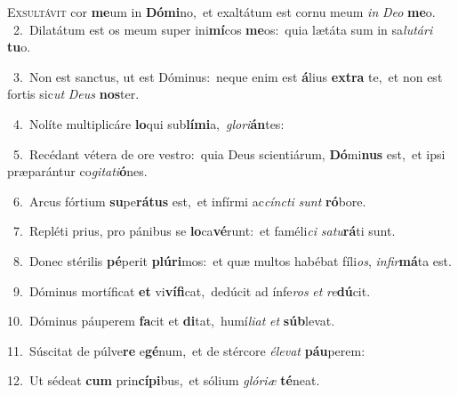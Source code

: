 \lettrine{\initial\textcolor{\initialcolor}{E}}{xsultávit} cor \textbf{me}\-um in \textbf{Dó}\-\textbf{mi}no,~\star et exaltátum est cornu meum \textit{in} \textit{De}\-\textit{o} \textbf{me}\-o.\\
{\numbfont\textcolor{\numbcolor}{~2.}}~Dilatátum est os meum super ini\-\textbf{mí}\-cos \textbf{me}\-os:~\star quia lætáta sum in sa\-\textit{lu}\-\textit{tá}\textit{ri} \textbf{tu}\-o.\par
{\numbfont\textcolor{\numbcolor}{~3.}}~Non est sanctus, ut est Dóminus:~\dagger neque enim est \textbf{á}\-lius \textbf{ex}\-\textbf{tra} te,~\star et non est fortis sic\textit{ut} \textit{De}\-\textit{us} \textbf{nos}\-ter.\par
{\numbfont\textcolor{\numbcolor}{~4.}}~Nolíte multiplicáre \textbf{lo}\-qui sub\-\textbf{lí}\-\textbf{mi}a,~\star \textit{glo}\-\textit{ri}\textbf{án}tes:\par
{\numbfont\textcolor{\numbcolor}{~5.}}~Recédant vétera de ore vestro:~\dagger quia Deus scientiárum, \textbf{Dó}\-mi\textbf{nus} est,~\star et ipsi præparántur co\-\textit{gi}\-\textit{ta}\textit{ti}\textbf{ó}nes.\par
{\numbfont\textcolor{\numbcolor}{~6.}}~Arcus fórtium \textbf{su}\-pe\-\textbf{rá}\-\textbf{tus} est,~\star et infírmi ac\-\textit{cínc}\-\textit{ti} \textit{sunt} \textbf{ró}\-bore.\par
{\numbfont\textcolor{\numbcolor}{~7.}}~Repléti prius, pro pánibus se \textbf{lo}\-ca\-\textbf{vé}\-runt:~\star et faméli\textit{ci} \textit{sa}\-\textit{tu}\textbf{rá}ti sunt.\par
{\numbfont\textcolor{\numbcolor}{~8.}}~Donec stérilis \textbf{pé}\-perit \textbf{plú}\-\textbf{ri}mos:~\star et quæ multos habébat fíli\-\textit{os}\-, \textit{in}\-\textit{fir}\textbf{má}ta est.\par
{\numbfont\textcolor{\numbcolor}{~9.}}~Dóminus mortíficat \textbf{et} vi\-\textbf{ví}\-\textbf{fi}cat,~\star dedúcit ad ínfe\textit{ros} \textit{et} \textit{re}\-\textbf{dú}cit.\par
{\numbfont\textcolor{\numbcolor}{10.}}~Dóminus páuperem \textbf{fa}\-cit et \textbf{di}\-tat,~\star humí\-\textit{li}\-\textit{at} \textit{et} \textbf{súb}\-levat.\par
{\numbfont\textcolor{\numbcolor}{11.}}~Súscitat de púlve\textbf{re} e\-\textbf{gé}\-num,~\star et de stércore \textit{é}\-\textit{le}\textit{vat} \textbf{páu}\-perem:\par
{\numbfont\textcolor{\numbcolor}{12.}}~Ut sédeat \textbf{cum} prin\-\textbf{cí}\-\textbf{pi}bus,~\star et sólium \textit{gló}\-\textit{ri}\textit{æ} \textbf{té}\-neat.\par
